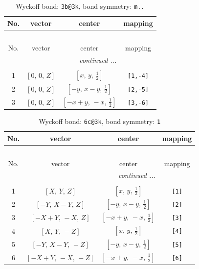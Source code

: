 \documentclass[fleqn,8pt]{jsarticle}
\begin{document}
\renewcommand{\arraystretch}{1.2}
\begin{longtable}{cccc}
\caption{Wyckoff bond: {\tt 3b@3k}, bond symmetry: {\tt m..}}
 \\
 \hline \hline
No. & vector & center & mapping \\ \hline \endfirsthead

\multicolumn{3}{l}{\tablename\ \thetable{}} \\
 \hline \hline
No. & vector & center & mapping \\ \hline \endhead

 \hline \hline
\multicolumn{3}{r}{\footnotesize\it continued ...} \\ \endfoot

 \hline \hline
\multicolumn{3}{r}{} \\ \endlastfoot

1 & $\left[ 0,\, 0,\, Z \right]$ & $\left[ x,\, y,\, \frac{1}{2} \right]$ & {\tt [1,-4]} \\ \hline
2 & $\left[ 0,\, 0,\, Z \right]$ & $\left[ - y,\, x - y,\, \frac{1}{2} \right]$ & {\tt [2,-5]} \\ \hline
3 & $\left[ 0,\, 0,\, Z \right]$ & $\left[ - x + y,\, - x,\, \frac{1}{2} \right]$ & {\tt [3,-6]} \\
\end{longtable}
\renewcommand{\arraystretch}{1.2}
\begin{longtable}{cccc}
\caption{Wyckoff bond: {\tt 6c@3k}, bond symmetry: {\tt 1}}
 \\
 \hline \hline
No. & vector & center & mapping \\ \hline \endfirsthead

\multicolumn{3}{l}{\tablename\ \thetable{}} \\
 \hline \hline
No. & vector & center & mapping \\ \hline \endhead

 \hline \hline
\multicolumn{3}{r}{\footnotesize\it continued ...} \\ \endfoot

 \hline \hline
\multicolumn{3}{r}{} \\ \endlastfoot

1 & $\left[ X,\, Y,\, Z \right]$ & $\left[ x,\, y,\, \frac{1}{2} \right]$ & {\tt [1]} \\ \hline
2 & $\left[ - Y,\, X - Y,\, Z \right]$ & $\left[ - y,\, x - y,\, \frac{1}{2} \right]$ & {\tt [2]} \\ \hline
3 & $\left[ - X + Y,\, - X,\, Z \right]$ & $\left[ - x + y,\, - x,\, \frac{1}{2} \right]$ & {\tt [3]} \\ \hline
4 & $\left[ X,\, Y,\, - Z \right]$ & $\left[ x,\, y,\, \frac{1}{2} \right]$ & {\tt [4]} \\ \hline
5 & $\left[ - Y,\, X - Y,\, - Z \right]$ & $\left[ - y,\, x - y,\, \frac{1}{2} \right]$ & {\tt [5]} \\ \hline
6 & $\left[ - X + Y,\, - X,\, - Z \right]$ & $\left[ - x + y,\, - x,\, \frac{1}{2} \right]$ & {\tt [6]} \\
\end{longtable}
\end{document}
